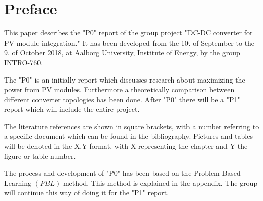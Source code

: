 \chapter*{Preface}

This paper describes the "P0" report of the group project "DC-DC converter for PV module integration." It has been developed from the 10. of September to the 9. of October 2018, at Aalborg University, Institute of Energy, by the group INTRO-760.

The "P0" is an initially report which discusses research about maximizing the power from PV modules.
Furthermore a theoretically comparison between different converter topologies has been done. After "P0" there will be a "P1" report which will include the entire project.

The literature references are shown in square brackets, with a number referring to a specific document which can be found in the bibliography. Pictures and tables will be denoted in the X,Y format, with X representing the chapter and Y the figure or table number. 

The process and development of "P0" has been based on the Problem Based Learning $(PBL)$ method. This method is explained in the appendix. The group will continue this way of doing it for the "P1" report.            
